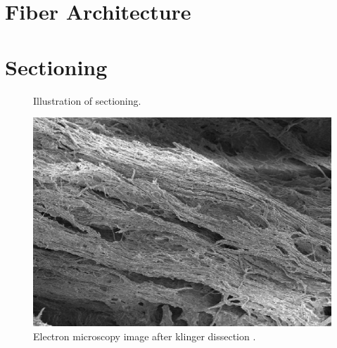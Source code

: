 \section{Fiber Architecture} \label{sec:fiberArchitecture}
%
\section{Sectioning}
%
\begin{figure}[!t]
	\centering
    \def\tikzwidth{0.75\textwidth}
	\caption{Illustration of sectioning.}
	\label{fig:brain_sectioning}
\end{figure}
% 
\begin{figure}[!t]
	\centering
	\includegraphics{gfx/neuroanatomy/human_wm_after_klinger_dissection.png}
	\caption{Electron microscopy image after klinger dissection \cite{destrieux:hal-01261930}.}
\end{figure}
% 
